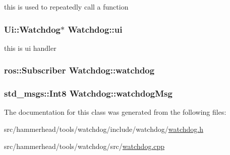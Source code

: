 this is used to repeatedly call a function 

\subsubsection[{\texorpdfstring{ui}{ui}}]{\setlength{\rightskip}{0pt plus 5cm}Ui\+::\+Watchdog$\ast$ Watchdog\+::ui\hspace{0.3cm}{\ttfamily [private]}}\hypertarget{classWatchdog_ad0634f3e34a6fc2ec3ea75bd6663424f}{}\label{classWatchdog_ad0634f3e34a6fc2ec3ea75bd6663424f}


this is ui handler 

\subsubsection[{\texorpdfstring{watchdog}{watchdog}}]{\setlength{\rightskip}{0pt plus 5cm}ros\+::\+Subscriber Watchdog\+::watchdog\hspace{0.3cm}{\ttfamily [private]}}\hypertarget{classWatchdog_a2c665ae63c37aecfc70a287b42adf80a}{}\label{classWatchdog_a2c665ae63c37aecfc70a287b42adf80a}
\subsubsection[{\texorpdfstring{watchdog\+Msg}{watchdogMsg}}]{\setlength{\rightskip}{0pt plus 5cm}std\+\_\+msgs\+::\+Int8 Watchdog\+::watchdog\+Msg\hspace{0.3cm}{\ttfamily [private]}}\hypertarget{classWatchdog_aa9a4d6844cc7c8565bf1a80e4c80acf1}{}\label{classWatchdog_aa9a4d6844cc7c8565bf1a80e4c80acf1}


The documentation for this class was generated from the following files\+:\begin{DoxyCompactItemize}
\item 
src/hammerhead/tools/watchdog/include/watchdog/\hyperlink{watchdog_8h}{watchdog.\+h}\item 
src/hammerhead/tools/watchdog/src/\hyperlink{watchdog_8cpp}{watchdog.\+cpp}\end{DoxyCompactItemize}

